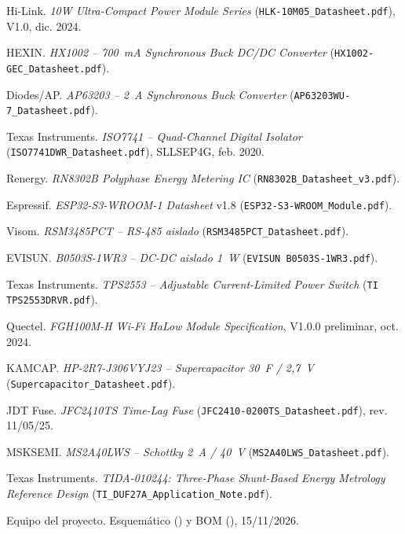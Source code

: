 \documentclass[11pt,a4paper]{article}
\begin{document}
\begin{enumerate}[label={[\arabic*]},leftmargin=2.2em]
  \item Hi-Link. \emph{10W Ultra-Compact Power Module Series}
        (\texttt{HLK-10M05\_Datasheet.pdf}), V1.0, dic. 2024.
  \item HEXIN. \emph{HX1002 -- 700~mA Synchronous Buck DC/DC Converter}
        (\texttt{HX1002-GEC\_Datasheet.pdf}).
  \item Diodes/AP. \emph{AP63203 -- 2~A Synchronous Buck Converter}
        (\texttt{AP63203WU-7\_Datasheet.pdf}).
  \item Texas Instruments. \emph{ISO7741 -- Quad-Channel Digital Isolator}
        (\texttt{ISO7741DWR\_Datasheet.pdf}), SLLSEP4G, feb. 2020.
  \item Renergy. \emph{RN8302B Polyphase Energy Metering IC}
        (\texttt{RN8302B\_Datasheet\_v3.pdf}).
  \item Espressif. \emph{ESP32-S3-WROOM-1 Datasheet} v1.8
        (\texttt{ESP32-S3-WROOM\_Module.pdf}).
  \item Visom. \emph{RSM3485PCT -- RS-485 aislado}
        (\texttt{RSM3485PCT\_Datasheet.pdf}).
  \item EVISUN. \emph{B0503S-1WR3 -- DC-DC aislado 1~W}
        (\texttt{EVISUN B0503S-1WR3.pdf}).
  \item Texas Instruments. \emph{TPS2553 -- Adjustable Current-Limited Power
        Switch} (\texttt{TI TPS2553DRVR.pdf}).
  \item Quectel. \emph{FGH100M-H Wi-Fi HaLow Module Specification}, V1.0.0
        preliminar, oct. 2024.
  \item KAMCAP. \emph{HP-2R7-J306VYJ23 -- Supercapacitor 30~F / 2,7~V}
        (\texttt{Supercapacitor\_Datasheet.pdf}).
  \item JDT Fuse. \emph{JFC2410TS Time-Lag Fuse}
        (\texttt{JFC2410-0200TS\_Datasheet.pdf}), rev. 11/05/25.
  \item MSKSEMI. \emph{MS2A40LWS -- Schottky 2~A / 40~V}
        (\texttt{MS2A40LWS\_Datasheet.pdf}).
  \item Texas Instruments. \emph{TIDA-010244: Three-Phase Shunt-Based Energy
        Metrology Reference Design} (\texttt{TI\_DUF27A\_Application\_Note.pdf}).
  \item Equipo del proyecto. Esquemático
        () y BOM
        (), 15/11/2026.
\end{enumerate}
\end{document}
